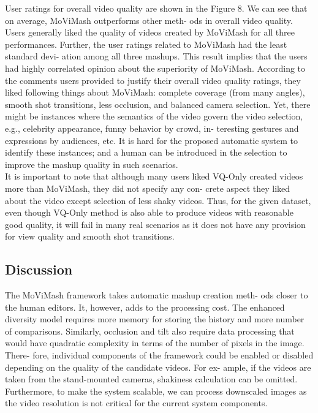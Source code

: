 \documentclass{sig-alternate}
\begin{document}
User ratings for overall video quality are shown in the Figure 8.
We can see that on average, MoViMash outperforms other meth-
ods in overall video quality. Users generally liked the quality of
videos created by MoViMash for all three performances. Further,
the user ratings related to MoViMash had the least standard devi-
ation among all three mashups. This result implies that the users
had highly correlated opinion about the superiority of MoViMash.
According to the comments users provided to justify their overall
video quality ratings, they liked following things about MoViMash:
complete coverage (from many angles), smooth shot transitions,
less occlusion, and balanced camera selection. Yet, there might
be instances where the semantics of the video govern the video
selection, e.g., celebrity appearance, funny behavior by crowd, in-
teresting gestures and expressions by audiences, etc. It is hard for
the proposed automatic system to identify these instances; and a
human can be introduced in the selection to improve the mashup
quality in such scenarios.\\
It is important to note that although many users liked VQ-Only
created videos more than MoViMash, they did not specify any con-
crete aspect they liked about the video except selection of less
shaky videos. Thus, for the given dataset, even though VQ-Only
method is also able to produce videos with reasonable good quality,
it will fail in many real scenarios as it does not have any provision
for view quality and smooth shot transitions.

\subsection{Discussion}
The MoViMash framework takes automatic mashup creation meth-
ods closer to the human editors. It, however, adds to the processing
cost. The enhanced diversity model requires more memory for storing the history and more number of comparisons. Similarly, occlusion and tilt also require data processing that would have quadratic
complexity in terms of the number of pixels in the image. There-
fore, individual components of the framework could be enabled or
disabled depending on the quality of the candidate videos. For ex-
ample, if the videos are taken from the stand-mounted cameras,
shakiness calculation can be omitted. Furthermore, to make the
system scalable, we can process downscaled images as the video
resolution is not critical for the current system components.
\end{document}
